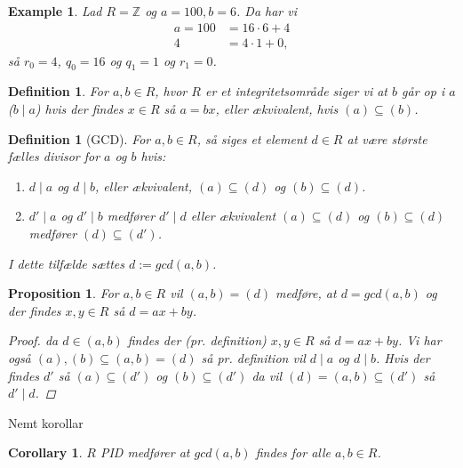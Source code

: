 \documentclass[10pt,twoside,openany,final]{memoir}
\theoremstyle{break}
\newtheorem{proposition}[section]{Proposition}
\newtheorem{corollary}[section]{Corollary}
\newtheorem{definition}[section]{Definition}
\theoremstyle{Break}
\newtheorem{example}[section]{Example}
\newcommand{\Z}{\mathbb{Z}}
\begin{document}
\begin{example}
Lad $R=\Z$ og $a=100,b=6$. Da har vi 
\begin{align*}
a=100&=16\cdot 6 + 4 \\
4 &= 4 \cdot 1 + 0,
\end{align*}så $r_0 =4$, $q_0 = 16$ og $q_1=1$ og $r_1=0$.
\end{example}
\begin{definition}
For $a,b \in R$, hvor $R$ er et integritetsområde siger vi at $b$ går op i $a$ ($b \mid a$) hvis der findes $x \in R$ så $a=bx$, eller ækvivalent, hvis $(a) \subseteq (b)$.
\end{definition}

\begin{definition}[GCD]
For $a,b \in R$, så siges et element $d \in R$ at være største fælles divisor for $a$ og $b$ hvis:
\begin{enumerate}
\item $d \mid a$ og $d \mid b$, eller ækvivalent, $(a) \subseteq (d)$ og $(b) \subseteq (d)$.
\item $d'\mid a$ og $d' \mid b$ medfører $d' \mid d$ eller ækvivalent $(a) \subseteq (d)$ og $(b) \subseteq (d)$ medfører $(d) \subseteq (d')$.
\end{enumerate}
I dette tilfælde sættes $d:=gcd(a,b)$.
\end{definition}

\begin{proposition}
For $a,b \in R$ vil $(a,b)=(d)$ medføre, at  $d=gcd(a,b)$ og der findes $x,y \in R$ så $d=ax+by$.
\begin{proof}
da $d \in (a,b)$ findes der (pr. definition) $x,y \in R$ så $d=ax+by$. Vi har også $(a),(b) \subseteq (a,b)=(d)$ så pr. definition vil $d \mid a$ og $d \mid b$. Hvis der findes $d'$ så $(a) \subseteq (d')$ og $(b) \subseteq (d')$ da vil $(d)=(a,b) \subseteq (d')$ så $d' \mid d$.
\end{proof}
\end{proposition}
Nemt korollar
\begin{corollary}
$R$ PID medfører at $gcd(a,b)$ findes for alle $a,b \in R$.
\end{corollary}
\end{document}

